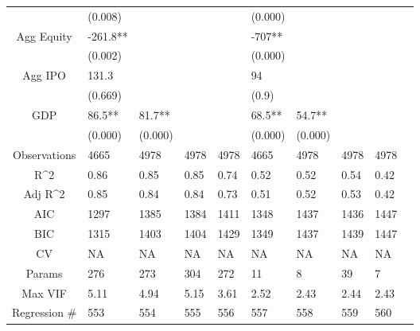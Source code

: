 \documentclass{article}
\begin{document}
\begin{table}[H]
\begin{tabular}{|clllllllll|}
   & (0.008) &  &  &  & (0.000) &  &  &  & \\ 
  Agg Equity & -261.8** &  &  &  & -707** &  &  &  & \\ 
   & (0.002) &  &  &  & (0.000) &  &  &  & \\ 
  Agg IPO & 131.3 &  &  &  & 94 &  &  &  & \\ 
   & (0.669) &  &  &  & (0.9) &  &  &  & \\ 
  GDP & 86.5** & 81.7** &  &  & 68.5** & 54.7** &  &  & \\ 
   & (0.000) & (0.000) &  &  & (0.000) & (0.000) &  &  & \\ 
  \hline 
 Observations & 4665 & 4978 & 4978 & 4978 & 4665 & 4978 & 4978 & 4978 & \\ 
  R^2 & 0.86 & 0.85 & 0.85 & 0.74 & 0.52 & 0.52 & 0.54 & 0.42 & \\ 
  Adj R^2 & 0.85 & 0.84 & 0.84 & 0.73 & 0.51 & 0.52 & 0.53 & 0.42 & \\ 
  AIC & 1297 & 1385 & 1384 & 1411 & 1348 & 1437 & 1436 & 1447 & \\ 
  BIC & 1315 & 1403 & 1404 & 1429 & 1349 & 1437 & 1439 & 1447 & \\ 
  CV & NA & NA & NA & NA & NA & NA & NA & NA & \\ 
  Params & 276 & 273 & 304 & 272 & 11 & 8 & 39 & 7 & \\ 
  Max VIF & 5.11 & 4.94 & 5.15 & 3.61 & 2.52 & 2.43 & 2.44 & 2.43 & \\ 
  Regression \# & 553 & 554 & 555 & 556 & 557 & 558 & 559 & 560 & \\ 
   \hline
\end{tabular}
 
\end{table}
\end{document}
